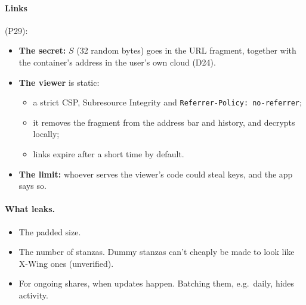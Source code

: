 \documentclass[11pt,a4paper]{article}
\newcommand{\dref}[1]{\textsf{#1}} %
\begin{document}
\paragraph{Links} (\dref{P29}):
\begin{itemize}
  \item \textbf{The secret:} $S$ (32 random bytes) goes in the URL fragment, together with the container's address in the user's own cloud (\dref{D24}).
  \item \textbf{The viewer} is static:
  \begin{itemize}
    \item a strict CSP, Subresource Integrity and \texttt{Referrer-Policy: no-referrer};
    \item it removes the fragment from the address bar and history, and decrypts locally;
    \item links expire after a short time by default.
  \end{itemize}
  \item \textbf{The limit:} whoever serves the viewer's code could steal keys, and the app says so.
\end{itemize}

\paragraph{What leaks.}
\begin{itemize}
  \item The padded size.
  \item The number of stanzas. Dummy stanzas can't cheaply be made to look like X-Wing ones (unverified).
  \item For ongoing shares, when updates happen. Batching them, e.g.\ daily, hides activity.
\end{itemize}
\end{document}
